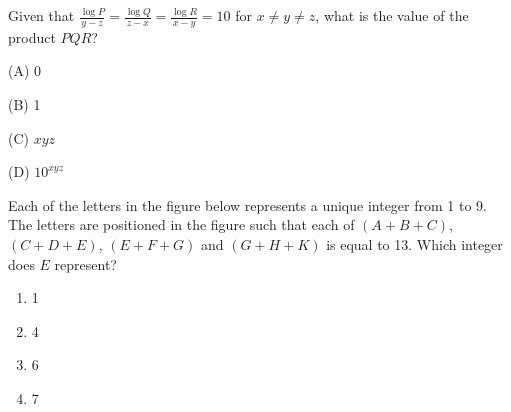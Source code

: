     \item{
            Given that \( \frac{\log P}{y-z} = \frac{\log Q}{z-x} = \frac{\log R}{x-y} = 10 \) for \( x \ne y \ne z \), what is the value of the product \( PQR \)?
            \begin{enumerate}
            	\begin{multicols}{4}
            		\item (A) 0
            		\item (B) 1
            		\item (C) $xyz$
            		\item (D) $10^{xyz}$
            	\end{multicols}
            \end{enumerate}
        }
    \item{
        
           	Each of the letters in the figure below represents a unique integer from 1 to 9. The letters are positioned in the figure such that each of \((A+B+C)\), \((C+D+E)\), \((E+F+G)\) and \((G+H+K)\) is equal to 13. Which integer does \(E\) represent?
           	\begin{center}
           	\end{center}
           	\begin{multicols}{4}
           		
				\begin{enumerate}
					\item 1
					\item 4
					\item 6
					\item 7
				\end{enumerate}
			\end{multicols}

        
        }



